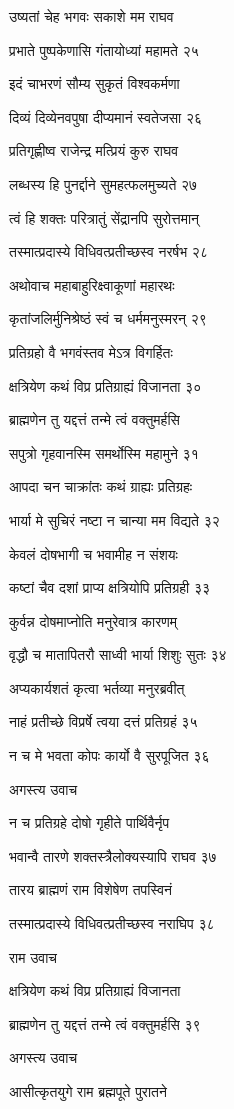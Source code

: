 उष्यतां चेह भगवः सकाशे मम राघव

प्रभाते पुष्पकेणासि गंतायोध्यां महामते २५

इदं चाभरणं सौम्य सुकृतं विश्वकर्मणा

दिव्यं दिव्येनवपुषा दीप्यमानं स्वतेजसा २६

प्रतिगृह्णीष्व राजेन्द्र मत्प्रियं कुरु राघव

लब्धस्य हि पुनर्द्दाने सुमहत्फलमुच्यते २७

त्वं हि शक्तः परित्रातुं सेंद्रानपि सुरोत्तमान्

तस्मात्प्रदास्ये विधिवत्प्रतीच्छस्व नरर्षभ २८

अथोवाच महाबाहुरिक्ष्वाकूणां महारथः

कृतांजलिर्मुनिश्रेष्ठं स्वं च धर्ममनुस्मरन् २९

प्रतिग्रहो वै भगवंस्तव मेऽत्र विगर्हितः

क्षत्रियेण कथं विप्र प्रतिग्राह्यं विजानता ३०

ब्राह्मणेन तु यद्दत्तं तन्मे त्वं वक्तुमर्हसि

सपुत्रो गृहवानस्मि समर्थोस्मि महामुने ३१

आपदा चन चाक्रांतः कथं ग्राह्यः प्रतिग्रहः

भार्या मे सुचिरं नष्टा न चान्या मम विद्यते ३२

केवलं दोषभागी च भवामीह न संशयः

कष्टां चैव दशां प्राप्य क्षत्रियोपि प्रतिग्रही ३३

कुर्वन्न दोषमाप्नोति मनुरेवात्र कारणम्

वृद्धौ च मातापितरौ साध्वी भार्या शिशुः सुतः ३४

अप्यकार्यशतं कृत्वा भर्तव्या मनुरब्रवीत्

नाहं प्रतीच्छे विप्रर्षे त्वया दत्तं प्रतिग्रहं ३५

न च मे भवता कोपः कार्यो वै सुरपूजित ३६

अगस्त्य उवाच

न च प्रतिग्रहे दोषो गृहीते पार्थिवैर्नृप

भवान्वै तारणे शक्तस्त्रैलोक्यस्यापि राघव ३७

तारय ब्राह्मणं राम विशेषेण तपस्विनं

तस्मात्प्रदास्ये विधिवत्प्रतीच्छस्व नराघिप ३८

राम उवाच

क्षत्रियेण कथं विप्र प्रतिग्राह्यं विजानता

ब्राह्मणेन तु यद्दत्तं तन्मे त्वं वक्तुमर्हसि ३९

अगस्त्य उवाच

आसीत्कृतयुगे राम ब्रह्मपूते पुरातने


